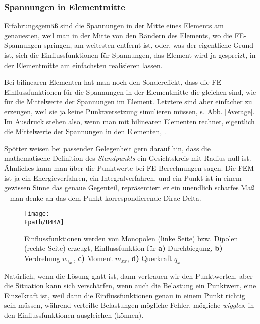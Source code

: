 {\textcolor{sectionTitleBlue}{\subsubsection*{Spannungen in Elementmitte}}}
Erfahrungsgem\"{a}{\ss} sind die Spannungen in der Mitte eines Elements am genauesten, weil man in der Mitte von den R\"{a}ndern des Elements, wo die FE-Spannungen springen, am weitesten entfernt ist, oder, was der eigentliche Grund ist, sich die Einflussfunktionen f\"{u}r Spannungen, das Element wird ja gespreizt, in der Elementmitte am einfachsten realisieren lassen.

Bei bilinearen Elementen hat man noch den Sondereffekt, dass die FE-Einflussfunktionen f\"{u}r die Spannungen in der Elementmitte die gleichen sind, wie f\"{u}r die Mittelwerte der Spannungen im Element. Letztere sind aber einfacher zu erzeugen, weil sie ja keine Punktversetzung simulieren m\"{u}ssen, s. Abb. \ref{Average}. Im Ausdruck stehen also, wenn man mit bilinearen Elementen rechnet, eigentlich die Mittelwerte der Spannungen in den Elementen, \cite{Ha5}.

Sp\"{o}tter weisen bei passender Gelegenheit gern darauf hin, dass die mathematische Definition des {\em Standpunkts\/} ein Gesichtskreis mit Radius null ist. \"{A}hnliches kann man \"{u}ber die Punktwerte bei FE-Berechnungen sagen. Die FEM ist ja ein Energieverfahren, ein Integralverfahren, und ein Punkt ist in einem gewissen Sinne das genaue Gegenteil, repr\"{a}sentiert er ein unendlich scharfes Ma{\ss} -- man denke an das dem Punkt korrespondierende Dirac Delta.

\begin{figure}[tbp]
\centering
\if {} \sidecaption \fi
\texttt{[image: \\Fpath/U44A]}
\caption{Einflussfunktionen werden von Monopolen (linke Seite) bzw. Dipolen (rechte Seite) erzeugt,  Einflussfunktion f\"{u}r \textbf{ a)} Durchbiegung,  \textbf{ b)} Verdrehung $w,_x$, \textbf{ c)} Moment $m_{xx}$,  \textbf{ d)} Querkraft $q_x$ }\label{U44A}
\end{figure}%

Nat\"{u}rlich, wenn die L\"{o}sung glatt ist, dann vertrauen wir den Punktwerten, aber die Situation kann sich versch\"{a}rfen, wenn auch die Belastung ein Punktwert, eine Einzelkraft ist, weil dann die Einflussfunktionen genau in einem Punkt richtig sein m\"{u}ssen, w\"{a}hrend verteilte Belastungen m\"{o}gliche Fehler, m\"{o}gliche {\em wiggles\/}, in den Einflussfunktionen ausgleichen (k\"{o}nnen).

